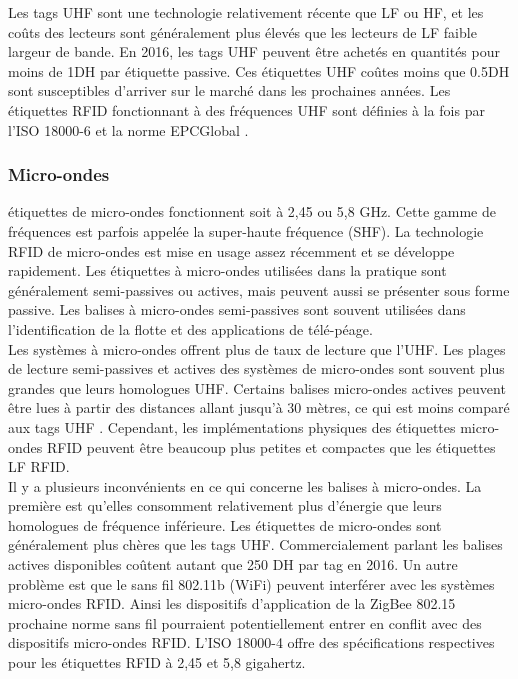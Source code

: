 \documentclass[11pt, a4paper, twoside]{book}
\begin{document}
Les tags UHF sont une technologie relativement récente que LF ou HF, et les coûts des lecteurs sont généralement plus élevés que les lecteurs de LF faible largeur de bande. En 2016, les tags UHF peuvent être achetés en quantités pour moins de 1DH par étiquette passive. Ces étiquettes UHF coûtes moins que  0.5DH sont susceptibles d'arriver sur le marché dans les prochaines années. Les étiquettes RFID fonctionnant à des fréquences UHF sont définies à la fois par l'ISO 18000-6 \cite{iso6} et la norme EPCGlobal \cite{air} .
\subsubsection{Micro-ondes} 
étiquettes de micro-ondes fonctionnent soit à 2,45 ou 5,8 GHz. Cette gamme de fréquences est parfois appelée la super-haute fréquence (SHF). La technologie RFID de micro-ondes est mise en usage assez récemment et se développe rapidement. Les étiquettes à micro-ondes utilisées dans la pratique sont généralement semi-passives ou actives, mais peuvent aussi se présenter sous forme passive. Les balises à micro-ondes semi-passives sont souvent utilisées dans l'identification de la flotte et des applications de télé-péage.\\


Les systèmes à micro-ondes offrent plus de taux de lecture que l'UHF. Les plages de lecture semi-passives et actives des systèmes de micro-ondes sont souvent plus grandes que leurs homologues UHF. Certains balises micro-ondes actives peuvent être lues à partir des distances allant jusqu'à 30 mètres, ce qui est moins comparé aux tags UHF . Cependant, les implémentations physiques des étiquettes micro-ondes  RFID peuvent être beaucoup plus petites et compactes que les étiquettes LF  RFID.\\


Il y a plusieurs inconvénients en ce qui concerne les balises à micro-ondes. La première est qu'elles consomment relativement plus d'énergie que leurs homologues de fréquence inférieure. Les étiquettes de micro-ondes sont généralement plus chères que les tags UHF. Commercialement parlant les balises actives disponibles coûtent autant que 250 DH par tag en 2016.
Un autre problème est que le sans fil 802.11b (WiFi) \cite{802.11b} peuvent interférer avec les systèmes micro-ondes RFID. Ainsi les dispositifs d'application de la ZigBee 802.15  \cite{802.15.4} prochaine norme sans fil pourraient potentiellement entrer en conflit avec des dispositifs micro-ondes RFID.
L'ISO 18000-4 \cite{iso4} offre des spécifications respectives pour les étiquettes RFID à 2,45 et 5,8 gigahertz. 
\end{document}
